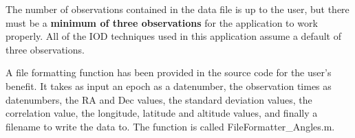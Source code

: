\documentclass{article}
\begin{document}
				The number of observations contained in the data file is up to the user, but there must be a \textbf{minimum of three observations} for the application to work properly.
				All of the IOD techniques used in this application assume a default of three observations. \par

				A file formatting function has been provided in the source code for the user's benefit. It takes as input an epoch as a datenumber, the observation times as datenumbers, the RA and Dec values, the 		                             
				standard deviation values, the correlation value, the longitude, latitude and altitude values, and
				finally a filename to write the data to. The function is called FileFormatter\_Angles.m.
\end{document}

